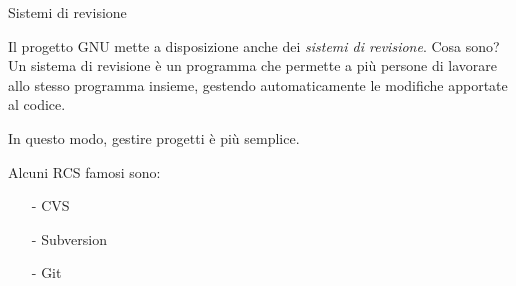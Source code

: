 \begin{slide}{Sistemi di revisione}
{\small
Il progetto GNU mette a disposizione anche dei \emph{sistemi di
revisione}. Cosa sono? Un sistema di revisione è un programma che
permette a più persone di lavorare allo stesso programma insieme,
gestendo automaticamente le modifiche apportate al codice.

In questo modo, gestire progetti è più semplice.

Alcuni RCS famosi sono:
\begin{itemize}
	\item[-] CVS
	\item[-] Subversion
	\item[-] Git
\end{itemize}
}
\end{slide}
